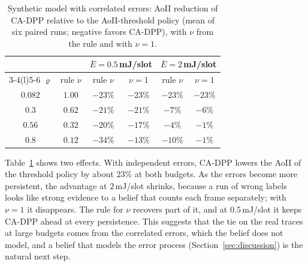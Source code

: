 \documentclass[5p,twocolumn]{elsarticle}
\theoremstyle{remark}
\begin{document}
\begin{table}[t]
\caption{Synthetic model with correlated errors: AoII reduction of CA-DPP relative to the AoII-threshold policy (mean of six paired runs; negative favors CA-DPP), with $\nu$ from the rule and with $\nu=1$.}\label{tab:corr}
\centering\footnotesize
\begin{tabular}{@{}cccccc@{}}
\toprule
 & & \multicolumn{2}{c}{$\bar E=0.5$\,mJ/slot} & \multicolumn{2}{c}{$\bar E=2$\,mJ/slot}\\
\cmidrule(lr){3-4}\cmidrule(l){5-6}
$\varrho$ & rule $\nu$ & rule $\nu$ & $\nu=1$ & rule $\nu$ & $\nu=1$\\
\midrule
$0.082$ & $1.00$ & $-23\%$ & $-23\%$ & $-23\%$ & $-23\%$\\
$0.3$ & $0.62$ & $-21\%$ & $-21\%$ & $-7\%$ & $-6\%$\\
$0.56$ & $0.32$ & $-20\%$ & $-17\%$ & $-4\%$ & $-1\%$\\
$0.8$ & $0.12$ & $-34\%$ & $-13\%$ & $-10\%$ & $-1\%$\\
\bottomrule
\end{tabular}
\end{table}

Table~\ref{tab:corr} shows two effects. With independent errors, CA-DPP lowers the AoII of the threshold policy by about $23\%$ at both budgets. As the errors become more persistent, the advantage at $2$\,mJ/slot shrinks, because a run of wrong labels looks like strong evidence to a belief that counts each frame separately; with $\nu=1$ it disappears. The rule for $\nu$ recovers part of it, and at $0.5$\,mJ/slot it keeps CA-DPP ahead at every persistence. This suggests that the tie on the real traces at large budgets comes from the correlated errors, which the belief does not model, and a belief that models the error process (Section~\ref{sec:discussion}) is the natural next step.
\end{document}
